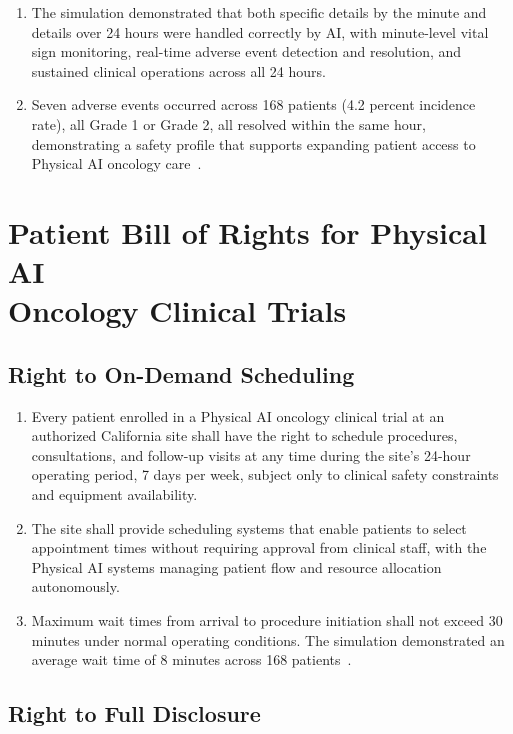 \documentclass[11pt,letterpaper]{article}
\begin{document}
\begin{enumerate}[label=(\alph*)]
\item The simulation demonstrated that both specific details by the minute and
  details over 24 hours were handled correctly by AI, with minute-level vital
  sign monitoring, real-time adverse event detection and resolution, and
  sustained clinical operations across all 24 hours.

\item Seven adverse events occurred across 168 patients (4.2 percent incidence
  rate), all Grade 1 or Grade 2, all resolved within the same hour,
  demonstrating a safety profile that supports expanding patient access to
  Physical AI oncology care~\cite{newtrial2026}.
\end{enumerate}

\section{Patient Bill of Rights for Physical AI\\Oncology Clinical Trials}

\subsection{Right to On-Demand Scheduling}

\begin{enumerate}[label=(\alph*)]
\item Every patient enrolled in a Physical AI oncology clinical trial at an
  authorized California site shall have the right to schedule procedures,
  consultations, and follow-up visits at any time during the site's 24-hour
  operating period, 7 days per week, subject only to clinical safety
  constraints and equipment availability.

\item The site shall provide scheduling systems that enable patients to select
  appointment times without requiring approval from clinical staff, with the
  Physical AI systems managing patient flow and resource allocation
  autonomously.

\item Maximum wait times from arrival to procedure initiation shall not exceed
  30 minutes under normal operating conditions. The simulation demonstrated
  an average wait time of 8 minutes across 168
  patients~\cite{newtrial2026}.
\end{enumerate}

\subsection{Right to Full Disclosure}
\end{document}
